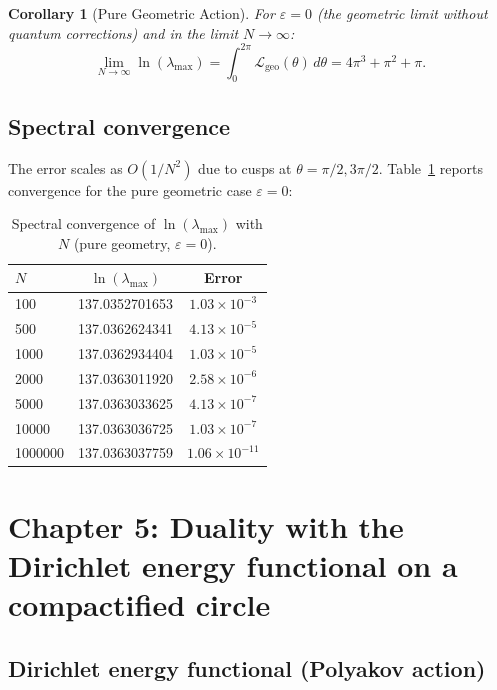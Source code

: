 \documentclass[12pt]{article}
\numberwithin{equation}{section}
\newtheorem{corollary}[theorem]{Corollary}
\begin{document}
\begin{corollary}[Pure Geometric Action]\label{cor:pure}
For \(\varepsilon = 0\) (the geometric limit without quantum corrections) and in the limit \(N \to \infty\):
\[
\lim_{N\to\infty} \ln(\lambda_{\max}) = \int_0^{2\pi} \mathcal{L}_{\text{geo}}(\theta) \, d\theta = 4\pi^3 + \pi^2 + \pi.
\]
\end{corollary}

\subsection{Spectral convergence}

The error scales as \(O(1/N^2)\) due to cusps at \(\theta = \pi/2, 3\pi/2\). Table~\ref{tab:convergence_mps} reports convergence for the pure geometric case \(\varepsilon=0\):

\begin{table}[h]
\centering
\caption{Spectral convergence of \(\ln(\lambda_{\max})\) with \(N\) (pure geometry, \(\varepsilon=0\)).}
\label{tab:convergence_mps}
\begin{tabular}{lcc}
\toprule
\(N\) & \(\ln(\lambda_{\max})\) & Error \\
\midrule
100     & 137.0352701653 & \(1.03\times10^{-3}\) \\
500     & 137.0362624341 & \(4.13\times10^{-5}\) \\
1000    & 137.0362934404 & \(1.03\times10^{-5}\) \\
2000    & 137.0363011920 & \(2.58\times10^{-6}\) \\
5000    & 137.0363033625 & \(4.13\times10^{-7}\) \\
10000   & 137.0363036725 & \(1.03\times10^{-7}\) \\
1000000 & 137.0363037759 & \(1.06\times10^{-11}\) \\
\bottomrule
\end{tabular}
\end{table}

\newpage

\section{Chapter 5: Duality with the Dirichlet energy functional on a compactified circle}

\subsection{Dirichlet energy functional (Polyakov action)}
\end{document}

